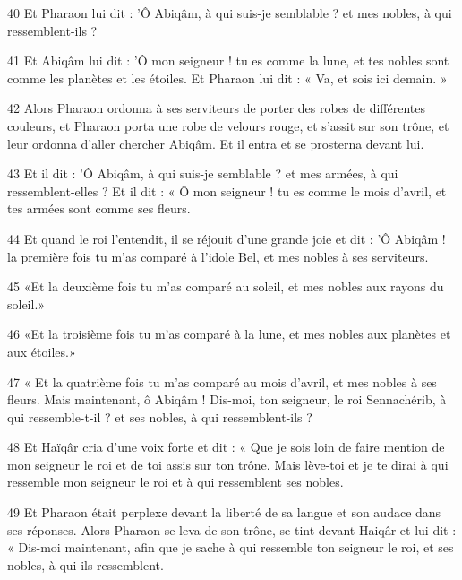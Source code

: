 \par 40 Et Pharaon lui dit : 'Ô Abiqâm, à qui suis-je semblable ? et mes nobles, à qui ressemblent-ils ?

\par 41 Et Abiqâm lui dit : 'Ô mon seigneur ! tu es comme la lune, et tes nobles sont comme les planètes et les étoiles. Et Pharaon lui dit : « Va, et sois ici demain. »

\par 42 Alors Pharaon ordonna à ses serviteurs de porter des robes de différentes couleurs, et Pharaon porta une robe de velours rouge, et s'assit sur son trône, et leur ordonna d'aller chercher Abiqâm. Et il entra et se prosterna devant lui.

\par 43 Et il dit : 'Ô Abiqâm, à qui suis-je semblable ? et mes armées, à qui ressemblent-elles ? Et il dit : « Ô mon seigneur ! tu es comme le mois d'avril, et tes armées sont comme ses fleurs.

\par 44 Et quand le roi l'entendit, il se réjouit d'une grande joie et dit : 'Ô Abiqâm ! la première fois tu m'as comparé à l'idole Bel, et mes nobles à ses serviteurs.

\par 45 «Et la deuxième fois tu m'as comparé au soleil, et mes nobles aux rayons du soleil.»

\par 46 «Et la troisième fois tu m'as comparé à la lune, et mes nobles aux planètes et aux étoiles.»

\par 47 « Et la quatrième fois tu m'as comparé au mois d'avril, et mes nobles à ses fleurs. Mais maintenant, ô Abiqâm ! Dis-moi, ton seigneur, le roi Sennachérib, à qui ressemble-t-il ? et ses nobles, à qui ressemblent-ils ?

\par 48 Et Haïqâr cria d'une voix forte et dit : « Que je sois loin de faire mention de mon seigneur le roi et de toi assis sur ton trône. Mais lève-toi et je te dirai à qui ressemble mon seigneur le roi et à qui ressemblent ses nobles.

\par 49 Et Pharaon était perplexe devant la liberté de sa langue et son audace dans ses réponses. Alors Pharaon se leva de son trône, se tint devant Haiqâr et lui dit : « Dis-moi maintenant, afin que je sache à qui ressemble ton seigneur le roi, et ses nobles, à qui ils ressemblent.


